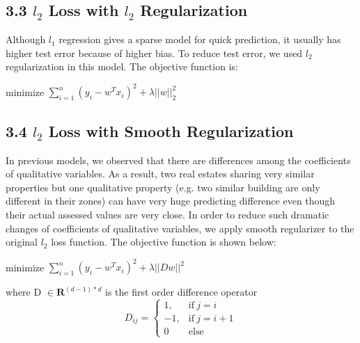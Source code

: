 \documentclass[9pt,twocolumn,twoside]{pnas-new}
\begin{document}
\subsection*{3.3 $l_{2}$ Loss with $l_{2}$ Regularization}
Although $l_1$ regression gives a sparse model for quick prediction, it usually has higher test error because of higher bias. To reduce test error, we used  $l_{2}$ regularization in this model. 
The objective function is: 
\begin{center}
minimize $\sum_{i=1}^{n}(y_{i} - w^{T}x_{i})^{2} + \lambda||w||_2^2 $ 
\end{center}

\subsection*{3.4 $l_{2}$ Loss with Smooth Regularization}
In previous models, we observed that there are differences among the coefficients of qualitative variables. As a result, two real estates sharing very similar properties but one qualitative property (e.g. two similar building are only different in their zones) can have very huge predicting difference even though their actual assessed values are very close. In order to reduce such dramatic changes of coefficients of qualitative variables, we apply smooth regularizer to the original $l_{2}$ loss function. The objective function is shown below: \newline
\begin{center}
minimize $\sum_{i=1}^{n}(y_{i} - w^{T}x_{i})^{2} + \lambda||Dw||^{2} $ 
\end{center}
where D $\in \textbf{R}^{(d-1) * d}$ is the first order difference operator
\begin{equation*}
  D_{ij} =
  	\begin{cases}
    	1, & \text{if}\  j = i \\
        -1, & \text{if}\  j = i + 1 \\
        0 & \text{else}
    \end{cases}
\end{equation*}
\end{document}
